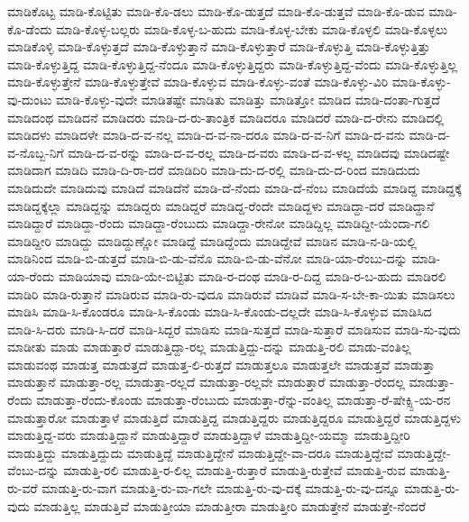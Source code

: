 {ಮಾಡಿಕೊಟ್ಟ
ಮಾಡಿ-ಕೊಟ್ಟಿತು
ಮಾಡಿ-ಕೊ-ಡಲು
ಮಾಡಿ-ಕೊ-ಡುತ್ತದೆ
ಮಾಡಿ-ಕೊ-ಡುತ್ತವೆ
ಮಾಡಿ-ಕೊ-ಡುವ
ಮಾಡಿ-ಕೊ-ಡೆಂದು
ಮಾಡಿ-ಕೊಳ್ಳ-ಬಲ್ಲರು
ಮಾಡಿ-ಕೊಳ್ಳ-ಬ-ಹುದು
ಮಾಡಿ-ಕೊಳ್ಳ-ಬೇಕು
ಮಾಡಿ-ಕೊಳ್ಳಲಿ
ಮಾಡಿ-ಕೊಳ್ಳಲು
ಮಾಡಿಕೊಳ್ಳಿ
ಮಾಡಿ-ಕೊಳ್ಳುತ್ತದೆ
ಮಾಡಿ-ಕೊಳ್ಳುತ್ತಾನೆ
ಮಾಡಿ-ಕೊಳ್ಳುತ್ತಾರೆ
ಮಾಡಿ-ಕೊಳ್ಳುತ್ತಿ
ಮಾಡಿ-ಕೊಳ್ಳುತ್ತಿತ್ತು
ಮಾಡಿ-ಕೊಳ್ಳುತ್ತಿದ್ದ
ಮಾಡಿ-ಕೊಳ್ಳುತ್ತಿದ್ದ-ನೆಂದೂ
ಮಾಡಿ-ಕೊಳ್ಳುತ್ತಿದ್ದರು
ಮಾಡಿ-ಕೊಳ್ಳುತ್ತಿದ್ದ-ವೆಂದು
ಮಾಡಿ-ಕೊಳ್ಳುತ್ತಿಲ್ಲ
ಮಾಡಿ-ಕೊಳ್ಳುತ್ತೇನೆ
ಮಾಡಿ-ಕೊಳ್ಳುತ್ತೇವೆ
ಮಾಡಿ-ಕೊಳ್ಳುವ
ಮಾಡಿ-ಕೊಳ್ಳು-ವಂತೆ
ಮಾಡಿ-ಕೊಳ್ಳು-ವಿರಿ
ಮಾಡಿ-ಕೊಳ್ಳು-ವು-ದುಂಟು
ಮಾಡಿ-ಕೊಳ್ಳು-ವುದೇ
ಮಾಡಿತಷ್ಟೇ
ಮಾಡಿತು
ಮಾಡಿತ್ತು
ಮಾಡಿತ್ತೋ
ಮಾಡಿದ
ಮಾಡಿ-ದಂತಾ-ಗುತ್ತದೆ
ಮಾಡಿದಂಥ
ಮಾಡಿದನೆ
ಮಾಡಿದರು
ಮಾಡಿ-ದ-ರು-ತಾಂತ್ರಿಕ
ಮಾಡಿದರೂ
ಮಾಡಿದರೆ
ಮಾಡಿ-ದ-ರೇನು
ಮಾಡಿದಲ್ಲಿ
ಮಾಡಿದಳು
ಮಾಡಿದಳೇ
ಮಾಡಿ-ದ-ವ-ನಲ್ಲ
ಮಾಡಿ-ದ-ವ-ನಾ-ದರೂ
ಮಾಡಿ-ದ-ವ-ನಿಗೆ
ಮಾಡಿ-ದ-ವನು
ಮಾಡಿ-ದ-ವ-ನೊಬ್ಬ-ನಿಗೆ
ಮಾಡಿ-ದ-ವ-ರನ್ನು
ಮಾಡಿ-ದ-ವ-ರಲ್ಲ
ಮಾಡಿ-ದ-ವರು
ಮಾಡಿ-ದ-ವ-ಳಲ್ಲ
ಮಾಡಿದವು
ಮಾಡಿದಷ್ಟೇ
ಮಾಡಿದಾಗ
ಮಾಡಿದಿ
ಮಾಡಿ-ದಿ-ರಾ-ದರೆ
ಮಾಡಿದಿರಿ
ಮಾಡಿ-ದು-ದ-ರಲ್ಲಿ
ಮಾಡಿ-ದು-ದ-ರಿಂದ
ಮಾಡಿದುದು
ಮಾಡಿದುದೇ
ಮಾಡಿದುವು
ಮಾಡಿದೆ
ಮಾಡಿದೆನೆ
ಮಾಡಿ-ದೆ-ನೆಂದು
ಮಾಡಿ-ದೆ-ನೆಂಬ
ಮಾಡಿದೆಯೆ
ಮಾಡಿದ್ದ
ಮಾಡಿದ್ದಕ್ಕೆ
ಮಾಡಿದ್ದಕ್ಕೆಲ್ಲಾ
ಮಾಡಿದ್ದನ್ನು
ಮಾಡಿದ್ದರು
ಮಾಡಿದ್ದರೆ
ಮಾಡಿದ್ದ-ರೆಂದೇ
ಮಾಡಿದ್ದಳು
ಮಾಡಿದ್ದಾ-ದರೆ
ಮಾಡಿದ್ದಾನೆ
ಮಾಡಿದ್ದಾರೆ
ಮಾಡಿದ್ದಾ-ರೆಂದು
ಮಾಡಿದ್ದಾ-ರೆಂಬುದು
ಮಾಡಿದ್ದಾ-ರೇನೋ
ಮಾಡಿದ್ದಿಲ್ಲ
ಮಾಡಿದ್ದೀ-ಯೆಂದಾ-ಗಲಿ
ಮಾಡಿದ್ದೀರಿ
ಮಾಡಿದ್ದು
ಮಾಡಿದ್ದುಣ್ಣೋ
ಮಾಡಿದ್ದೆ
ಮಾಡಿದ್ದೆಂದು
ಮಾಡಿದ್ದೇವೆ
ಮಾಡಿನ
ಮಾಡಿ-ನ-ಡಿ-ಯಲ್ಲಿ
ಮಾಡಿನಿಂದ
ಮಾಡಿ-ಬಿ-ಡುತ್ತದೆ
ಮಾಡಿ-ಬಿ-ಡು-ವೆನೊ
ಮಾಡಿ-ಬಿ-ಡು-ವೆನೋ
ಮಾಡಿ-ಯಾ-ರೆಂಬು-ದನ್ನು
ಮಾಡಿ-ಯಾ-ರೆಂದು
ಮಾಡಿಯಾವು
ಮಾಡಿ-ಯೇ-ಬಿಟ್ಟಿತು
ಮಾಡಿ-ರ-ದಂಥ
ಮಾಡಿ-ರ-ದಿದ್ದ
ಮಾಡಿ-ರ-ಬ-ಹುದು
ಮಾಡಿರಲಿ
ಮಾಡಿರಿ
ಮಾಡಿ-ರುತ್ತಾನೆ
ಮಾಡಿರುವ
ಮಾಡಿ-ರು-ವುದೂ
ಮಾಡಿರುವೆ
ಮಾಡಿವೆ
ಮಾಡಿ-ಸ-ಬೇ-ಕಾ-ಯಿತು
ಮಾಡಿಸಲು
ಮಾಡಿಸಿ
ಮಾಡಿ-ಸಿ-ಕೊಂಡರೂ
ಮಾಡಿ-ಸಿ-ಕೊಂಡು
ಮಾಡಿ-ಸಿ-ಕೊಂಡು-ದಲ್ಲದೇ
ಮಾಡಿ-ಸಿ-ಕೊಳ್ಳುವ
ಮಾಡಿಸಿದ
ಮಾಡಿ-ಸಿ-ದರು
ಮಾಡಿ-ಸಿ-ದರೆ
ಮಾಡಿ-ಸಿದ್ದರೆ
ಮಾಡಿಸು
ಮಾಡಿ-ಸುತ್ತದೆ
ಮಾಡಿ-ಸುತ್ತಾರೆ
ಮಾಡಿಸುವ
ಮಾಡಿ-ಸು-ವುದು
ಮಾಡೀತು
ಮಾಡು
ಮಾಡುತ್ತಾರೆ
ಮಾಡುತ್ತಿದ್ದಾ-ರಲ್ಲ
ಮಾಡುತ್ತಿದ್ದು-ದನ್ನು
ಮಾಡುತ್ತಿ-ರಲಿ
ಮಾಡು-ವಂತಿಲ್ಲ
ಮಾಡುವಂಥ
ಮಾಡುತ್ತ
ಮಾಡುತ್ತದೆ
ಮಾಡುತ್ತ-ಲಿ-ರುತ್ತದೆ
ಮಾಡುತ್ತಲೂ
ಮಾಡುತ್ತಲೇ
ಮಾಡುತ್ತವೆ
ಮಾಡುತ್ತಾ
ಮಾಡುತ್ತಾನೆ
ಮಾಡುತ್ತಾ-ರಲ್ಲ
ಮಾಡುತ್ತಾ-ರಲ್ಲದೆ
ಮಾಡುತ್ತಾ-ರಲ್ಲವೇ
ಮಾಡುತ್ತಾರೆ
ಮಾಡುತ್ತಾ-ರೆಂದಲ್ಲ
ಮಾಡುತ್ತಾ-ರೆಂದು
ಮಾಡುತ್ತಾ-ರೆಂದು-ಕೊಂಡು
ಮಾಡುತ್ತಾ-ರೆಂಬುದು
ಮಾಡುತ್ತಾ-ರೆನ್ನು-ವಂತಿಲ್ಲ
ಮಾಡುತ್ತಾ-ರೆ-ಷೇಕ್ಸ್ಪಿ-ಯ-ರನ
ಮಾಡುತ್ತಾರೋ
ಮಾಡುತ್ತಾಳೆ
ಮಾಡುತ್ತಿದೆ
ಮಾಡುತ್ತಿದ್ದ
ಮಾಡುತ್ತಿದ್ದರು
ಮಾಡುತ್ತಿದ್ದರೂ
ಮಾಡುತ್ತಿದ್ದರೆ
ಮಾಡುತ್ತಿದ್ದಳು
ಮಾಡುತ್ತಿದ್ದ-ವರು
ಮಾಡುತ್ತಿದ್ದಾನೆ
ಮಾಡುತ್ತಿದ್ದಾರೆ
ಮಾಡುತ್ತಿದ್ದಾಳೆ
ಮಾಡುತ್ತಿದ್ದೀ-ಯಮ್ಮಾ
ಮಾಡುತ್ತಿದ್ದೀರಿ
ಮಾಡುತ್ತಿದ್ದು
ಮಾಡುತ್ತಿದ್ದುದು
ಮಾಡುತ್ತಿದ್ದೆ
ಮಾಡುತ್ತಿದ್ದೇನೆ
ಮಾಡುತ್ತಿದ್ದೇ-ವಾ-ದರೂ
ಮಾಡುತ್ತಿದ್ದೇವೆ
ಮಾಡುತ್ತಿದ್ದೇ-ವೆಂಬು-ದನ್ನು
ಮಾಡುತ್ತಿ-ರಲಿ
ಮಾಡುತ್ತಿ-ರ-ಲಿಲ್ಲ
ಮಾಡುತ್ತಿ-ರುತ್ತಾರೆ
ಮಾಡುತ್ತಿ-ರುತ್ತೇವೆ
ಮಾಡುತ್ತಿ-ರುವ
ಮಾಡುತ್ತಿ-ರು-ವರೆ
ಮಾಡುತ್ತಿ-ರು-ವಾಗ
ಮಾಡುತ್ತಿ-ರು-ವಾ-ಗಲೇ
ಮಾಡುತ್ತಿ-ರು-ವು-ದಕ್ಕೆ
ಮಾಡುತ್ತಿ-ರು-ವು-ದನ್ನೂ
ಮಾಡುತ್ತಿ-ರು-ವುದು
ಮಾಡುತ್ತಿಲ್ಲ
ಮಾಡುತ್ತಿವೆ
ಮಾಡುತ್ತೀಯಾ
ಮಾಡುತ್ತೀರಾ
ಮಾಡುತ್ತೀರಿ
ಮಾಡುತ್ತೇನೆ
ಮಾಡುತ್ತೇ-ನೆಂದರೆ
}
